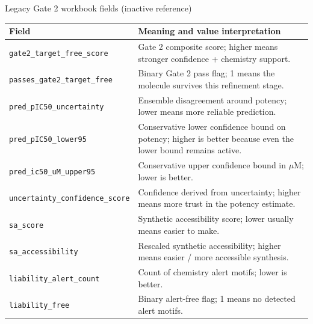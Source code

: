 \documentclass[aspectratio=169,10pt]{beamer}
\begin{document}
\begin{frame}{Legacy Gate 2 workbook fields (inactive reference)}
  \scriptsize
  \begin{tabularx}{\textwidth}{lX}
    \toprule
    \textbf{Field} & \textbf{Meaning and value interpretation} \\
    \midrule
    \texttt{gate2\_target\_free\_score} & Gate 2 composite score; higher means stronger confidence + chemistry support. \\
    \texttt{passes\_gate2\_target\_free} & Binary Gate 2 pass flag; 1 means the molecule survives this refinement stage. \\
    \texttt{pred\_pIC50\_uncertainty} & Ensemble disagreement around potency; lower means more reliable prediction. \\
    \texttt{pred\_pIC50\_lower95} & Conservative lower confidence bound on potency; higher is better because even the lower bound remains active. \\
    \texttt{pred\_ic50\_uM\_upper95} & Conservative upper confidence bound in \(\mu\)M; lower is better. \\
    \texttt{uncertainty\_confidence\_score} & Confidence derived from uncertainty; higher means more trust in the potency estimate. \\
    \texttt{sa\_score} & Synthetic accessibility score; lower usually means easier to make. \\
    \texttt{sa\_accessibility} & Rescaled synthetic accessibility; higher means easier / more accessible synthesis. \\
    \texttt{liability\_alert\_count} & Count of chemistry alert motifs; lower is better. \\
    \texttt{liability\_free} & Binary alert-free flag; 1 means no detected alert motifs. \\
    \bottomrule
  \end{tabularx}
\end{frame}
\end{document}
